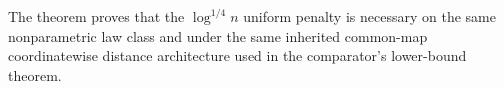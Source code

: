 The theorem proves that the \(\log^{1/4}n\) uniform penalty is necessary on the same nonparametric law class and under the same inherited common-map coordinatewise distance architecture used in the comparator's lower-bound theorem.